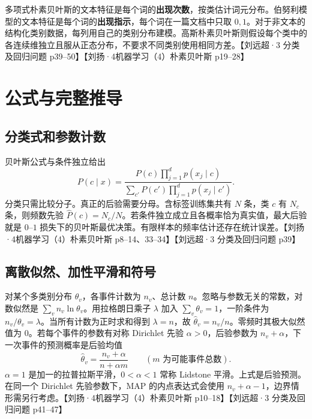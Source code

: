 \documentclass[UTF8,a4paper,zihao=-4,fontset=fandol]{ctexrep}
\begin{document}
多项式朴素贝叶斯的文本特征是每个词的\textbf{出现次数}，按类估计词元分布。伯努利模型的文本特征是每个词的\textbf{出现指示}，每个词在一篇文档中只取 $0,1$。对于非文本的结构化类别数据，每列用自己的类别分布建模。高斯朴素贝叶斯则假设每个类中的各连续维独立且服从正态分布，不要求不同类别使用相同方差。【刘远超·3 分类及回归问题 p39–50】【刘扬·4机器学习（4）朴素贝叶斯 p19–28】

\section{公式与完整推导}
\subsection*{分类式和参数计数}
贝叶斯公式与条件独立给出
\[
 P(c\mid x)=
 \frac{P(c)\prod_{j=1}^d p(x_j\mid c)}
      {\sum_{c'}P(c')\prod_{j=1}^d p(x_j\mid c')}.
\]
分类只需比较分子。真正的后验需要分母。含标签训练集共有 $N$ 条，类 $c$ 有 $N_c$ 条，则频数先验 $\widehat P(c)=N_c/N$。若条件独立成立且各概率恰为真实值，最大后验就是 $0$--$1$ 损失下的贝叶斯最优决策。有限样本的频率估计还存在统计误差。【刘扬·4机器学习（4）朴素贝叶斯 p8–14、33–34】【刘远超·3 分类及回归问题 p39】

\subsection*{离散似然、加性平滑和符号}
对某个多类别分布 $\theta_v$，各事件计数为 $n_v$、总计数 $n$。忽略与参数无关的常数，对数似然是 $\sum_v n_v\ln\theta_v$。用拉格朗日乘子 $\lambda$ 加入 $\sum_v\theta_v=1$，一阶条件为 $n_v/\theta_v=\lambda$。当所有计数为正时求和得到 $\lambda=n$，故 $\widehat\theta_v=n_v/n$。零频时其极大似然值为 0。若每个事件的参数有对称 Dirichlet 先验 $\alpha>0$，后验参数为 $n_v+\alpha$，下一次事件的预测概率是后验均值
\[
 \widehat\theta_v=\frac{n_v+\alpha}{n+\alpha m}\qquad(m\text{ 为可能事件总数}).
\]
$\alpha=1$ 是加一的拉普拉斯平滑，$0<\alpha<1$ 常称 Lidstone 平滑。上式是后验预测。在同一个 Dirichlet 先验参数下，MAP 的内点表达式会使用 $n_v+\alpha-1$，边界情形需另行考虑。【刘扬·4机器学习（4）朴素贝叶斯 p10–18】【刘远超·3 分类及回归问题 p41–47】
\end{document}
